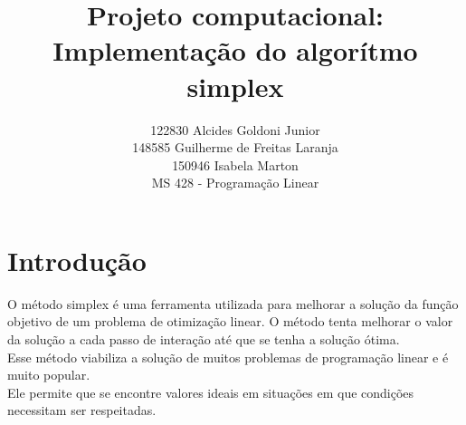 \documentclass[a4paper]{article}
\title{Projeto computacional: Implementa\c{c}\~ao do algor\'itmo simplex}
\author{122830 Alcides Goldoni Junior\\
		148585 Guilherme de Freitas Laranja\\
		150946 Isabela Marton\\
	\small MS 428 - Programa\c{c}\~ao Linear\\
	}%
\begin{document}
\maketitle
\section{Introdu\c{c}\~ao}
O m\'etodo simplex \'e uma ferramenta utilizada para melhorar a solu\c{c}\~ao da fun\c{c}\~ao objetivo de um problema de otimiza\c{c}\~ao linear. O m\'etodo tenta melhorar o valor da solu\c{c}\~ao a cada passo de intera\c{c}\~ao at\'e que se tenha a solu\c{c}\~ao \'otima.\\
Esse m\'etodo viabiliza a solu\c{c}\~ao de muitos problemas de programa\c{c}\~ao linear e \'e muito popular.\\
Ele permite que se encontre valores ideais em situa\c{c}\~oes em que condi\c{c}\~oes necessitam ser respeitadas.\\
\end{document}
